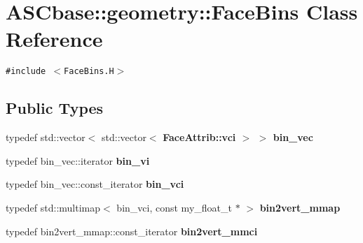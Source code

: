 \section{ASCbase::geometry::Face\-Bins Class Reference}
\label{classASCbase_1_1geometry_1_1FaceBins}
{\tt \#include $<$Face\-Bins.H$>$}

\subsection*{Public Types}
\begin{CompactItemize}
\item 
typedef std::vector$<$ std::vector$<$ \bf{Face\-Attrib::vci} $>$ $>$ \textbf{bin\_\-vec}\label{classASCbase_1_1geometry_1_1FaceBins_a3dce5cb791c141498e19582ec6082ff}

\item 
typedef bin\_\-vec::iterator \textbf{bin\_\-vi}\label{classASCbase_1_1geometry_1_1FaceBins_b18d45138a3d245ded25a784d1b08024}

\item 
typedef bin\_\-vec::const\_\-iterator \textbf{bin\_\-vci}\label{classASCbase_1_1geometry_1_1FaceBins_dce15524d5ca553395257c9fbc9bfd8a}

\item 
typedef std::multimap$<$ bin\_\-vci, const my\_\-float\_\-t $\ast$ $>$ \textbf{bin2vert\_\-mmap}\label{classASCbase_1_1geometry_1_1FaceBins_58e128fd98431ca4cb237fd525fdaa60}

\item 
typedef bin2vert\_\-mmap::const\_\-iterator \textbf{bin2vert\_\-mmci}\label{classASCbase_1_1geometry_1_1FaceBins_f1db25ac06e59f0cb4b24474a2b9d0c3}

\end{CompactItemize}
